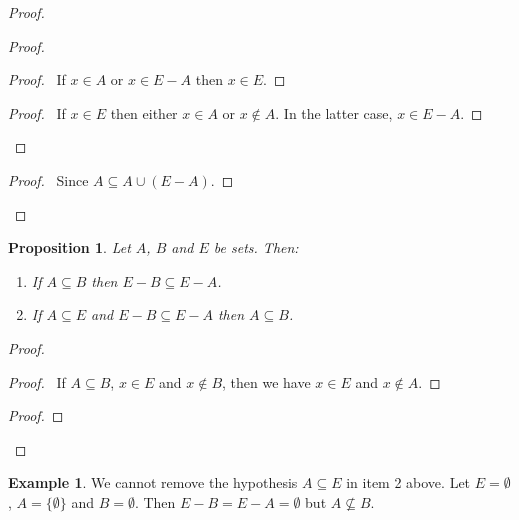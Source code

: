 \documentclass{report}
\let\qed\relax
\newtheorem{prop}[ax]{Proposition}
\theoremstyle{definition}
\newtheorem{ex}[ax]{Example}
\begin{document}
\begin{proof}
\pf
{}
\begin{proof}
	\begin{proof}
		\pf\ If $x \in A$ or $x \in E - A$ then $x \in E$.
	\end{proof}
	\begin{proof}
		\pf\ If $x \in E$ then either $x \in A$ or $x \notin A$. In the latter case, $x \in E - A$.
	\end{proof}
\end{proof}
\begin{proof}
	\pf\ Since $A \subseteq A \cup (E - A)$.
\end{proof}
\qed
\end{proof}

\begin{prop}
Let $A$, $B$ and $E$ be sets. Then:
\begin{enumerate}
\item If $A \subseteq B$ then $E - B \subseteq E - A$.
\item If $A \subseteq E$ and $E - B \subseteq E - A$ then $A \subseteq B$.
\end{enumerate}
\end{prop}

\begin{proof}
\pf
{}
\begin{proof}
	\pf\ If $A \subseteq B$, $x \in E$ and $x \notin B$, then we have $x \in E$ and $x \notin A$.
\end{proof}
\begin{proof}
\end{proof}
\qed
\end{proof}

\begin{ex}
We cannot remove the hypothesis $A \subseteq E$ in item 2 above. Let $E = \emptyset$, $A = \{\emptyset\}$ and $B = \emptyset$. Then $E - B = E - A = \emptyset$ but $A \not\subseteq B$.
\end{ex}
\end{document}
